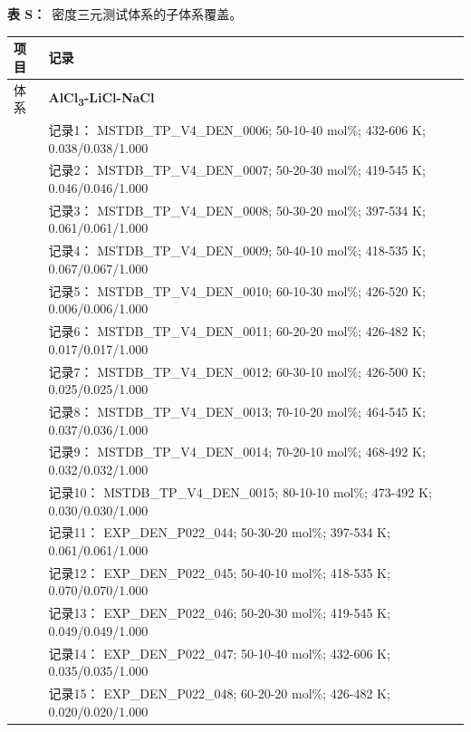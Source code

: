 \documentclass[12pt]{article}
\renewcommand{\thetable}{S\arabic{table}}
\newcommand{\sitablecaption}[1]{\Needspace{12\baselineskip}\par\noindent\stepcounter{table}\textbf{表 \thetable：}~#1\par\nobreak\smallskip}
\newcommand{\silongtablecaption}[1]{\sitablecaption{#1}\addtocounter{table}{-1}}
\begin{document}
{
\silongtablecaption{密度三元测试体系的子体系覆盖。}
\begin{longtable}[]{@{}
  >{\raggedright\arraybackslash}p{}
  >{\raggedright\arraybackslash}p{}@{}}
\toprule\noalign{}
\begin{minipage}[b]{\linewidth}\raggedright
项目
\end{minipage} & \begin{minipage}[b]{\linewidth}\raggedright
记录
\end{minipage} \\
\midrule\noalign{}
\endhead
\bottomrule\noalign{}
\endlastfoot
体系 & \textbf{AlCl\textsubscript{3}-LiCl-NaCl} \\
 & 记录1： MSTDB\_TP\_V4\_DEN\_0006; 50-10-40 mol\%; 432-606 K; 0.038/0.038/1.000 \\
 & 记录2： MSTDB\_TP\_V4\_DEN\_0007; 50-20-30 mol\%; 419-545 K; 0.046/0.046/1.000 \\
 & 记录3： MSTDB\_TP\_V4\_DEN\_0008; 50-30-20 mol\%; 397-534 K; 0.061/0.061/1.000 \\
 & 记录4： MSTDB\_TP\_V4\_DEN\_0009; 50-40-10 mol\%; 418-535 K; 0.067/0.067/1.000 \\
 & 记录5： MSTDB\_TP\_V4\_DEN\_0010; 60-10-30 mol\%; 426-520 K; 0.006/0.006/1.000 \\
 & 记录6： MSTDB\_TP\_V4\_DEN\_0011; 60-20-20 mol\%; 426-482 K; 0.017/0.017/1.000 \\
 & 记录7： MSTDB\_TP\_V4\_DEN\_0012; 60-30-10 mol\%; 426-500 K; 0.025/0.025/1.000 \\
 & 记录8： MSTDB\_TP\_V4\_DEN\_0013; 70-10-20 mol\%; 464-545 K; 0.037/0.036/1.000 \\
 & 记录9： MSTDB\_TP\_V4\_DEN\_0014; 70-20-10 mol\%; 468-492 K; 0.032/0.032/1.000 \\
 & 记录10： MSTDB\_TP\_V4\_DEN\_0015; 80-10-10 mol\%; 473-492 K; 0.030/0.030/1.000 \\
 & 记录11： EXP\_DEN\_P022\_044; 50-30-20 mol\%; 397-534 K; 0.061/0.061/1.000 \\
 & 记录12： EXP\_DEN\_P022\_045; 50-40-10 mol\%; 418-535 K; 0.070/0.070/1.000 \\
 & 记录13： EXP\_DEN\_P022\_046; 50-20-30 mol\%; 419-545 K; 0.049/0.049/1.000 \\
 & 记录14： EXP\_DEN\_P022\_047; 50-10-40 mol\%; 432-606 K; 0.035/0.035/1.000 \\
 & 记录15： EXP\_DEN\_P022\_048; 60-20-20 mol\%; 426-482 K; 0.020/0.020/1.000 \\

\end{longtable}}
\end{document}
